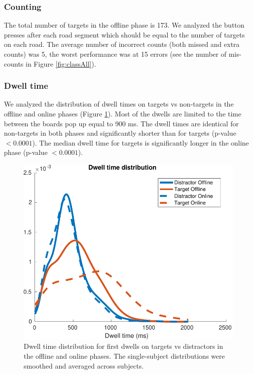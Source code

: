 \documentclass[12pt]{iopart}
\begin{document}
\subsubsection*{Counting}
The total number of targets in the offline phase is 173.
We analyzed the button presses after each road segment
which should be equal to the number of targets
on each road.
The average number of incorrect counts (both missed and extra counts) was 5,
the worst performance was at 15 errors (see the number of mis-counts in Figure \ref{fig:classAll}).


\subsubsection*{Dwell time}
We analyzed the distribution of dwell times on targets vs non-targets
in the offline and online phases (Figure \ref{fig:dwell}). 
Most of the dwells are limited to the time between the boards pop up equal to 900 ms.
The dwell times are identical for non-targets in both phases and significantly
shorter than for targets (p-value $< 0.0001$).
The median dwell time for targets is significantly longer in the online phase (p-value $< 0.0001$).

\begin{figure}[!t]
    \includegraphics[trim={0cm 0cm 0cm 0cm},clip,width=0.6\columnwidth]{../images/DwelltimeDist_online_allmean.pdf}
    \caption{Dwell time distribution for first dwells on
    targets vs distractors in the offline and online phases. The single-subject
    distributions were smoothed and averaged across subjects.}
\label{fig:dwell}
\end{figure}
\end{document}
